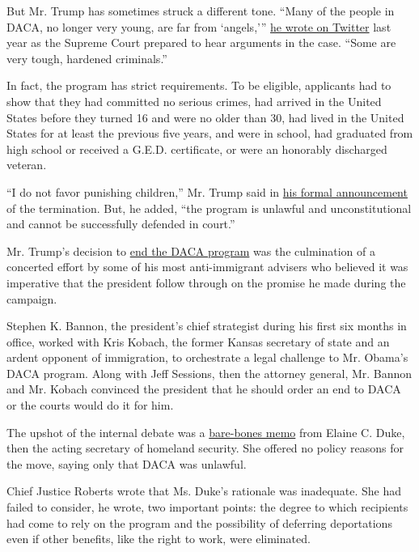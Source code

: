 But Mr. Trump has sometimes struck a different tone. ``Many of the
people in DACA, no longer very young, are far from `angels,'''
\href{https://twitter.com/realDonaldTrump/status/1194219655717642240?ref_src=twsrc\%5Egoogle\%7Ctwcamp\%5Eserp\%7Ctwgr\%5Etweet}{he
wrote on Twitter} last year as the Supreme Court prepared to hear
arguments in the case. ``Some are very tough, hardened criminals.''

In fact, the program has strict requirements. To be eligible, applicants
had to show that they had committed no serious crimes, had arrived in
the United States before they turned 16 and were no older than 30, had
lived in the United States for at least the previous five years, and
were in school, had graduated from high school or received a G.E.D.
certificate, or were an honorably discharged veteran.

``I do not favor punishing children,'' Mr. Trump said in
\href{https://www.whitehouse.gov/briefings-statements/statement-president-donald-j-trump-7/}{his
formal announcement} of the termination. But, he added, ``the program is
unlawful and unconstitutional and cannot be successfully defended in
court.''

Mr. Trump's decision to
\href{https://www.nytimes3xbfgragh.onion/2020/06/19/us/politics/trump-daca.html}{end
the DACA program} was the culmination of a concerted effort by some of
his most anti-immigrant advisers who believed it was imperative that the
president follow through on the promise he made during the campaign.

Stephen K. Bannon, the president's chief strategist during his first six
months in office, worked with Kris Kobach, the former Kansas secretary
of state and an ardent opponent of immigration, to orchestrate a legal
challenge to Mr. Obama's DACA program. Along with Jeff Sessions, then
the attorney general, Mr. Bannon and Mr. Kobach convinced the president
that he should order an end to DACA or the courts would do it for him.

The upshot of the internal debate was a
\href{https://www.dhs.gov/news/2017/09/05/memorandum-rescission-daca}{bare-bones
memo} from Elaine C. Duke, then the acting secretary of homeland
security. She offered no policy reasons for the move, saying only that
DACA was unlawful.

Chief Justice Roberts wrote that Ms. Duke's rationale was inadequate.
She had failed to consider, he wrote, two important points: the degree
to which recipients had come to rely on the program and the possibility
of deferring deportations even if other benefits, like the right to
work, were eliminated.

